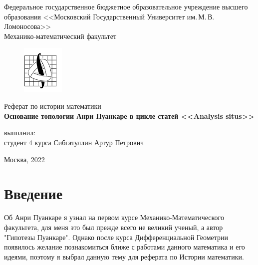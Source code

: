 \documentclass[specialist, subf, href, colorlinks=true, 14pt, times, mtpro, final]{disser}
\theoremstyle{definition}
\begin{document}
	
	\begin{titlepage}
		\begin{center}
			
			Федеральное государственное бюджетное образовательное учреждение высшего образования 
			<<Московский Государственный Университет им.\,М.\,В.\,Ломоносова>>\\
			
			Механико-математический факультет
			
			\begin{figure}[!htp]
				\begin{center}
					{\includegraphics[width=20mm]{mmlogo.png}}
				\end{center}
			\end{figure}
			
			\vspace{3cm}
			
			Реферат по истории математики\\
			{\bf Основание топологии Анри Пуанкаре в цикле статей <<Analysis situs>>}
			
			\vspace{10cm}
			\begin{flushright}
				{ выполнил:}\\
				студент 4 курса Сибгатуллин Артур Петрович\\[0.5cm]
			\end{flushright}
			\vspace{1cm}
			
			\normalsize Москва, 2022
		\end{center}
	\end{titlepage}
	
	
	\tableofcontents
	
	\section{Введение}
	Об Анри Пуанкаре я узнал на первом курсе Механико-Математического факультета, для меня это был прежде всего не великий ученый, а автор "Гипотезы Пуанкаре". Однако после курса Дифференциальной Геометрии появилось желание познакомиться ближе с работами данного математика и его идеями, поэтому я выбрал данную тему для реферата по Истории математики.
	
\end{document}
